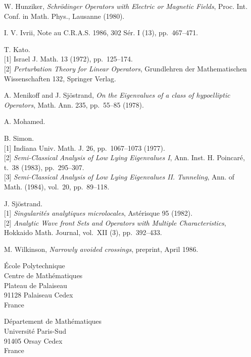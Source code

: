 \documentclass[11pt]{article}
\begin{document}
\begin{description}[leftmargin=3.2cm,style=nextline]
\item[{[HU]}] W. Hunziker, \emph{Schrödinger Operators with Electric or Magnetic Fields}, Proc. Int. Conf. in Math. Phys., Lausanne (1980).

\item[{[IV]}] I. V. Ivrii, Note au C.R.A.S. 1986, 302 Sér. I (13), pp.~467--471.

\item[{[KA]}] T. Kato.\\
{}[1] Israel J. Math. 13 (1972), pp.~125--174.\\
{}[2] \emph{Perturbation Theory for Linear Operators}, Grundlehren der Mathematischen Wissenschaften 132, Springer Verlag.

\item[{[ME--SJ]}] A. Menikoff and J. Sjöstrand, \emph{On the Eigenvalues of a class of hypoelliptic Operators}, Math. Ann. 235, pp.~55--85 (1978).

\item[{[MO]}] A. Mohamed.

\item[{[SI]}] B. Simon.\\
{}[1] Indiana Univ. Math. J. 26, pp.~1067--1073 (1977).\\
{}[2] \emph{Semi-Classical Analysis of Low Lying Eigenvalues I}, Ann. Inst. H. Poincaré, t.~38 (1983), pp.~295--307.\\
{}[3] \emph{Semi-Classical Analysis of Low Lying Eigenvalues II. Tunneling}, Ann. of Math. (1984), vol.~20, pp.~89--118.

\item[{[SJ]}] J. Sjöstrand.\\
{}[1] \emph{Singularités analytiques microlocales}, Astérisque 95 (1982).\\
{}[2] \emph{Analytic Wave front Sets and Operators with Multiple Characteristics}, Hokkaido Math. Journal, vol.~XII (3), pp.~392--433.

\item[{[WI]}] M. Wilkinson, \emph{Narrowly avoided crossings}, preprint, April 1986.
\end{description}

\bigskip
\noindent
École Polytechnique\\
Centre de Mathématiques\\
Plateau de Palaiseau\\
91128 Palaiseau Cedex\\
France

\medskip
\noindent
Département de Mathématiques\\
Université Paris-Sud\\
91405 Orsay Cedex\\
France
\end{document}
